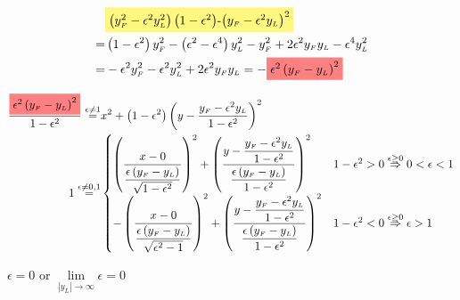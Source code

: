 \documentclass[
]{book}
\theoremstyle{definition}
\theoremstyle{definition}
\theoremstyle{definition}
\theoremstyle{definition}
\theoremstyle{remark}
\begin{document}
\[
\begin{aligned}
 & \colorbox{yellow!50}{\text{\ensuremath{\left(y_{{\scriptscriptstyle F}}^{2}-\epsilon^{2}y_{{\scriptscriptstyle L}}^{2}\right)\left(1-\epsilon^{2}\right)}-\ensuremath{\left(y_{{\scriptscriptstyle F}}-\epsilon^{2}y_{{\scriptscriptstyle L}}\right)^{2}}}}\\
= & \left(1-\epsilon^{2}\right)y_{{\scriptscriptstyle F}}^{2}-\left(\epsilon^{2}-\epsilon^{4}\right)y_{{\scriptscriptstyle L}}^{2}-y_{{\scriptscriptstyle F}}^{2}+2\epsilon^{2}y_{{\scriptscriptstyle F}}y_{{\scriptscriptstyle L}}-\epsilon^{4}y_{{\scriptscriptstyle L}}^{2}\\
= & -\epsilon^{2}y_{{\scriptscriptstyle F}}^{2}-\epsilon^{2}y_{{\scriptscriptstyle L}}^{2}+2\epsilon^{2}y_{{\scriptscriptstyle F}}y_{{\scriptscriptstyle L}}=-\colorbox{red!50}{\text{\ensuremath{\epsilon^{2}\left(y_{{\scriptscriptstyle F}}-y_{{\scriptscriptstyle L}}\right)^{2}}}}
\end{aligned}
\]

\[
\begin{aligned}
\dfrac{\colorbox{red!50}{\text{\ensuremath{\epsilon^{2}\left(y_{{\scriptscriptstyle F}}-y_{{\scriptscriptstyle L}}\right)^{2}}}}}{1-\epsilon^{2}}\overset{\epsilon\ne1}{=} & x^{2}+\left(1-\epsilon^{2}\right)\left(y-\dfrac{y_{{\scriptscriptstyle F}}-\epsilon^{2}y_{{\scriptscriptstyle L}}}{1-\epsilon^{2}}\right)^{2}\\
1\overset{\epsilon\ne0,1}{=} & \begin{cases}
\left(\dfrac{x-0}{\dfrac{\epsilon\left(y_{{\scriptscriptstyle F}}-y_{{\scriptscriptstyle L}}\right)}{\sqrt{1-\epsilon^{2}}}}\right)^{2}+\left(\dfrac{y-\dfrac{y_{{\scriptscriptstyle F}}-\epsilon^{2}y_{{\scriptscriptstyle L}}}{1-\epsilon^{2}}}{\dfrac{\epsilon\left(y_{{\scriptscriptstyle F}}-y_{{\scriptscriptstyle L}}\right)}{1-\epsilon^{2}}}\right)^{2} & 1-\epsilon^{2}>0\overset{\epsilon\ge0}{\Rightarrow}0<\epsilon<1\\
-\left(\dfrac{x-0}{\dfrac{\epsilon\left(y_{{\scriptscriptstyle F}}-y_{{\scriptscriptstyle L}}\right)}{\sqrt{\epsilon^{2}-1}}}\right)^{2}+\left(\dfrac{y-\dfrac{y_{{\scriptscriptstyle F}}-\epsilon^{2}y_{{\scriptscriptstyle L}}}{1-\epsilon^{2}}}{\dfrac{\epsilon\left(y_{{\scriptscriptstyle F}}-y_{{\scriptscriptstyle L}}\right)}{1-\epsilon^{2}}}\right)^{2} & 1-\epsilon^{2}<0\overset{\epsilon\ge0}{\Rightarrow}\epsilon>1
\end{cases}
\end{aligned}
\]

\(\epsilon=0\) or \(\lim\limits _{\left|y_{L}\right|\rightarrow\infty}\epsilon=0\)
\end{document}
